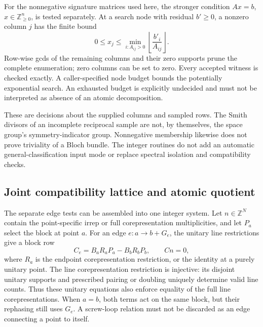 For the nonnegative signature matrices used here, the stronger condition
$Ax=b$, $x\in\mathbb Z_{\geq0}^n$, is tested separately. At a search
node with residual $b'\geq0$, a nonzero column $j$ has the finite bound
\begin{equation}
 0\leq x_j\leq
 \min_{i:A_{ij}>0}\left\lfloor\frac{b'_i}{A_{ij}}\right\rfloor.
\end{equation}
Row-wise gcds of the remaining columns and their zero supports prune
the complete enumeration; zero columns can be set to zero. Every
accepted witness is checked exactly. A caller-specified node budget
bounds the potentially exponential search. An exhausted budget is
explicitly undecided and must not be interpreted as absence of an
atomic decomposition.

These are decisions about the supplied columns and sampled rows.
The Smith divisors of an incomplete reciprocal sample are not, by
themselves, the space group's symmetry-indicator group. Nonnegative
membership likewise does not prove triviality of a Bloch bundle.
The integer routines do not add an automatic general-classification
input mode or replace spectral isolation and compatibility checks.

\subsection{Joint compatibility lattice and atomic quotient}
The separate edge tests can be assembled into one integer system.
Let $n\in\mathbb Z^N$ contain the point-specific irrep or full
corepresentation multiplicities, and let $P_a$ select the block at
point $a$. For an edge $e:a\to b+G_e$, the unitary line restrictions
give a block row
\begin{equation}
 C_e=B_aR_aP_a-B_bR_bP_b,\qquad Cn=0,
 \label{eq:joint-compatibility}
\end{equation}
where $R_a$ is the endpoint corepresentation restriction, or the
identity at a purely unitary point. The line corepresentation
restriction is injective: its disjoint unitary supports and prescribed
pairing or doubling uniquely determine valid line counts. Thus these
unitary equations also enforce equality of the full line
corepresentations. When $a=b$, both terms act on the same block,
but their rephasing still uses $G_e$. A screw-loop relation must not
be discarded as an edge connecting a point to itself.

